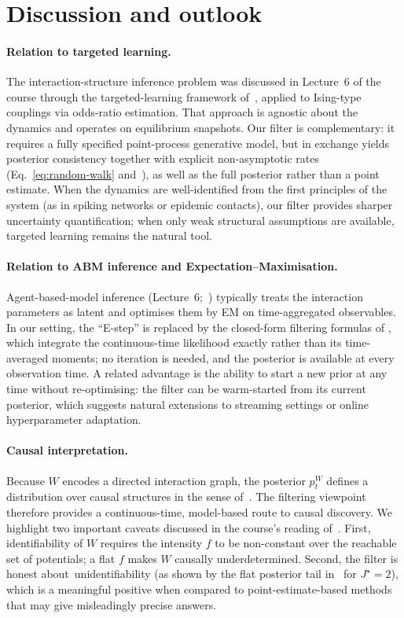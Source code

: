 \documentclass[11pt,a4paper]{article}
\theoremstyle{definition}
\begin{document}
\section{Discussion and outlook}
\label{sec:discussion}

\paragraph{Relation to targeted learning.} The interaction-structure
inference problem was discussed in Lecture~6 of the course through the
targeted-learning framework of~\citet{vanderLaanRose2011}, applied to Ising-type couplings via odds-ratio estimation. That approach is agnostic about the dynamics and operates
on equilibrium snapshots. Our filter is complementary: it requires a
fully specified point-process generative model, but in exchange
yields posterior consistency together with explicit non-asymptotic
rates (Eq.~\eqref{eq:random-walk} and~), as well as the full
posterior rather than a point estimate. When the dynamics are
well-identified from the first principles of the system (as in spiking
networks or epidemic contacts), our filter provides sharper
uncertainty quantification; when only weak structural assumptions are
available, targeted learning remains the natural tool.

\paragraph{Relation to ABM inference and Expectation--Maximisation.}
Agent-based-model inference (Lecture~6;~\citealp{Banisch2015})
typically treats the interaction parameters as latent and optimises
them by EM on time-aggregated observables. In our setting, the
``E-step'' is replaced by the closed-form filtering formulas of
, which integrate the continuous-time likelihood
exactly rather than its time-averaged moments; no iteration is needed,
and the posterior is available at every observation time. A related
advantage is the ability to start a new prior at any time without
re-optimising: the filter can be warm-started from its current
posterior, which suggests natural extensions to streaming settings or
online hyperparameter adaptation.

\paragraph{Causal interpretation.} Because $W$ encodes a directed
interaction graph, the posterior $p_t^W$ defines a distribution over
causal structures in the sense of~\citet{Pearl2009}. The filtering
viewpoint therefore provides a continuous-time, model-based route to
causal discovery. We highlight two important caveats discussed in the
course's reading of~\citet{Manzo2022}. First, identifiability of $W$
requires the intensity $f$ to be non-constant over the reachable set
of potentials; a flat $f$ makes $W$ causally underdetermined.
Second, the filter is honest about~unidentifiability (as shown by the
flat posterior tail in~ for $J^\star = 2$), which is
a meaningful positive when compared to point-estimate-based methods
that may give misleadingly precise answers.
\end{document}

